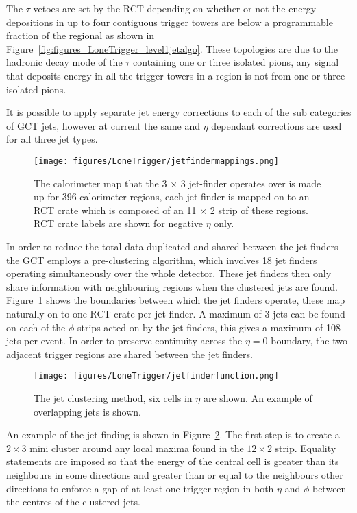 The $\tau$-vetoes are set by the RCT depending on whether or not the energy 
depositions in up to four contiguous trigger towers are below a programmable 
fraction of the regional \ET as shown in 
Figure~\ref{fig:figures_LoneTrigger_level1jetalgo}. These topologies are due to the hadronic decay mode of the $\tau$ containing one or three isolated pions, any signal that deposits energy in all the trigger towers in a region is not from one or three isolated pions.

It is possible to apply separate jet energy corrections to each of the sub 
categories of GCT jets, however at current the same \ET and $\eta$ dependant 
corrections are used for all three jet types.

\begin{figure}[ht]
  \centering    
  \texttt{[image: figures/LoneTrigger/jetfindermappings.png]}
  \caption{The calorimeter map that the 3 $\times$ 3 jet-finder operates over
   is made up for 396 calorimeter regions, each jet finder is mapped on to an 
   RCT crate which is composed of an 11 $\times$ 2 strip of these regions. RCT
   crate labels are shown for negative $\eta$ only. }
  \label{fig:figures_LoneTrigger_jetfindermappings}
\end{figure}

In order to reduce the total data duplicated and shared between the jet finders
the GCT employs a pre-clustering algorithm, which involves 18 jet finders 
operating simultaneously over the whole detector. These jet finders then only
share information with neighbouring regions when the clustered jets are found.
Figure~\ref{fig:figures_LoneTrigger_jetfindermappings} shows the boundaries 
between which the jet finders operate, these map naturally on to one RCT crate 
per jet finder. A maximum of 3 jets can be found on each of the $\phi$ strips
acted on by the jet finders, this gives a maximum of 108 jets per event. In
order to preserve continuity across the $\eta = 0$ boundary, the two adjacent
trigger regions are shared between the jet finders.


\begin{figure}[ht]
  \centering
 \texttt{[image: figures/LoneTrigger/jetfinderfunction.png]}
  \caption{The \Lone jet clustering method, six cells in $\eta$ are shown. An
  example of overlapping jets is shown.\cite{ilesgct}}
  \label{fig:figures_LoneTrigger_jetfinderfunction}
\end{figure}


An example of the jet finding is shown in
Figure~\ref{fig:figures_LoneTrigger_jetfinderfunction}. The first step is to 
create a $2 \times 3$ mini cluster around any local maxima found in the $12 
\times 2$ strip. Equality statements are imposed so that the energy of the 
central cell is greater than its neighbours in some directions and greater than 
or equal to the neighbours other directions to enforce a gap of at least one 
trigger region in both $\eta$ and $\phi$ between the centres of the clustered 
jets.

